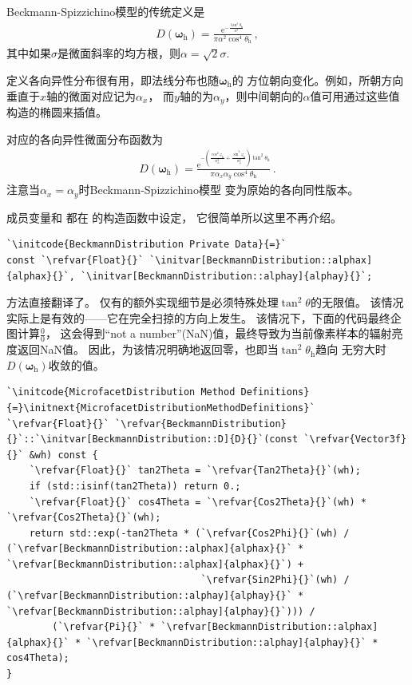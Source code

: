 Beckmann-Spizzichino模型的传统定义是
\begin{align}\label{eq:8.9}
    D({\bm\omega}_{\mathrm{h}})=\frac{\mathrm{e}^{-\frac{\tan^2\theta_{\mathrm{h}}}{\alpha^2}}}{\pi\alpha^2\cos^4\theta_{\mathrm{h}}}\, ,
\end{align}
其中如果$\sigma$是微面斜率的均方根，则$\alpha=\sqrt{2}\sigma$.

定义各向异性分布很有用，即法线分布也随${\bm\omega}_{\mathrm{h}}$的
方位朝向变化。例如，所朝方向垂直于$x$轴的微面对应记为$\alpha_x$，
而$y$轴的为$\alpha_y$，则中间朝向的$\alpha$值可用通过这些值构造的椭圆来插值。

对应的各向异性微面分布函数为
\begin{align}\label{eq:8.10}
    D({\bm\omega}_{\mathrm{h}})=\frac{\mathrm{e}^{-\left(\frac{\cos^2\varphi_{\mathrm{h}}}{\alpha_x^2}+\frac{\sin^2\varphi_{\mathrm{h}}}{\alpha_y^2}\right)\tan^2\theta_{\mathrm{h}}}}{\pi\alpha_x\alpha_y\cos^4\theta_{\mathrm{h}}}\, .
\end{align}
注意当$\alpha_x=\alpha_y$时Beckmann-Spizzichino模型
变为原始的各向同性版本。

成员变量和
都在
的构造函数中设定，
它很简单所以这里不再介绍。
\begin{lstlisting}
`\initcode{BeckmannDistribution Private Data}{=}`
const `\refvar{Float}{}` `\initvar[BeckmannDistribution::alphax]{alphax}{}`, `\initvar[BeckmannDistribution::alphay]{alphay}{}`;
\end{lstlisting}

方法直接翻译了。
仅有的额外实现细节是必须特殊处理$\tan^2\theta$的无限值。
该情况实际上是有效的——它在完全扫掠的方向上发生。
该情况下，下面的代码最终企图计算$\displaystyle\frac{0}{0}$，
这会得到“not a number”(NaN)值，最终导致为当前像素样本的辐射亮度返回NaN值。
因此，为该情况明确地返回零，也即当$\tan^2\theta_{\mathrm{h}}$趋向
无穷大时$D({\bm\omega}_{\mathrm{h}})$收敛的值。
\begin{lstlisting}
`\initcode{MicrofacetDistribution Method Definitions}{=}\initnext{MicrofacetDistributionMethodDefinitions}`
`\refvar{Float}{}` `\refvar{BeckmannDistribution}{}`::`\initvar[BeckmannDistribution::D]{D}{}`(const `\refvar{Vector3f}{}` &wh) const {
    `\refvar{Float}{}` tan2Theta = `\refvar{Tan2Theta}{}`(wh);
    if (std::isinf(tan2Theta)) return 0.;
    `\refvar{Float}{}` cos4Theta = `\refvar{Cos2Theta}{}`(wh) * `\refvar{Cos2Theta}{}`(wh);
    return std::exp(-tan2Theta * (`\refvar{Cos2Phi}{}`(wh) / (`\refvar[BeckmannDistribution::alphax]{alphax}{}` * `\refvar[BeckmannDistribution::alphax]{alphax}{}`) +
                                  `\refvar{Sin2Phi}{}`(wh) / (`\refvar[BeckmannDistribution::alphay]{alphay}{}` * `\refvar[BeckmannDistribution::alphay]{alphay}{}`))) /
        (`\refvar{Pi}{}` * `\refvar[BeckmannDistribution::alphax]{alphax}{}` * `\refvar[BeckmannDistribution::alphay]{alphay}{}` * cos4Theta);
}
\end{lstlisting}

